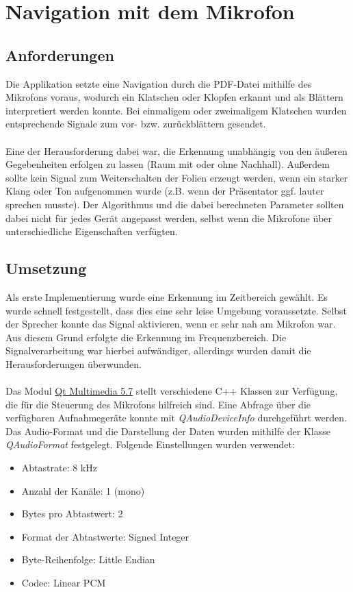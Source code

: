 \chapter{Navigation mit dem Mikrofon}
\thispagestyle{fancy}

\section{Anforderungen}
Die Applikation setzte eine Navigation durch die PDF-Datei mithilfe des Mikrofons voraus, wodurch ein Klatschen oder Klopfen erkannt und als Blättern interpretiert werden konnte. Bei einmaligem oder zweimaligem Klatschen wurden entsprechende Signale zum vor- bzw. zurückblättern gesendet. \\
\\
Eine der Herausforderung dabei war, die Erkennung unabhängig von den äußeren Gegebenheiten erfolgen zu lassen (Raum mit oder ohne Nachhall). Außerdem sollte kein Signal zum Weiterschalten der Folien erzeugt werden, wenn ein starker Klang oder Ton aufgenommen wurde (z.B. wenn der Präsentator ggf. lauter sprechen musste). Der Algorithmus und die dabei berechneten Parameter sollten dabei nicht für jedes Gerät angepasst werden, selbst wenn die Mikrofone über unterschiedliche Eigenschaften verfügten. 

\section{Umsetzung}
Als erste Implementierung wurde eine Erkennung im Zeitbereich gewählt. Es wurde schnell festgestellt, dass dies eine sehr leise Umgebung voraussetzte. Selbst der Sprecher konnte das Signal aktivieren, wenn er sehr nah am Mikrofon war. Aus diesem Grund erfolgte die Erkennung im Frequenzbereich. Die Signalverarbeitung war hierbei aufwändiger, allerdings wurden damit die Herausforderungen überwunden.\\
\\
Das Modul  \href{http://doc.qt.io/qt-5/qtmultimedia-index.html}{Qt Multimedia 5.7} stellt verschiedene C++ Klassen zur Verfügung, die für die Steuerung des Mikrofons hilfreich sind. Eine Abfrage über die verfügbaren Aufnahmegeräte konnte mit \textit{QAudioDeviceInfo} durchgeführt werden. Das Audio-Format und die Darstellung der Daten wurden mithilfe der Klasse \textit{QAudioFormat} festgelegt. Folgende Einstellungen wurden verwendet:

\begin{center}
	\begin{itemize}
		\item Abtastrate: 8 kHz
		\item Anzahl der Kanäle: 1 (mono)
		\item Bytes pro Abtastwert: 2
		\item Format der Abtastwerte: Signed Integer
		\item Byte-Reihenfolge: Little Endian
		\item Codec: Linear PCM	
	\end{itemize}
\end{center}

